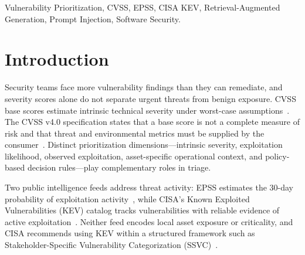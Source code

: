 \documentclass[conference]{IEEEtran}
\begin{document}
\begin{IEEEkeywords}
Vulnerability Prioritization, CVSS, EPSS, CISA KEV, Retrieval-Augmented Generation, Prompt Injection, Software Security.
\end{IEEEkeywords}

\section{Introduction}
Security teams face more vulnerability findings than they can remediate, and severity scores alone do not separate urgent threats from benign exposure. CVSS base scores estimate intrinsic technical severity under worst-case assumptions~\cite{first2019cvss}. The CVSS v4.0 specification states that a base score is not a complete measure of risk and that threat and environmental metrics must be supplied by the consumer~\cite{first2023cvss4}. Distinct prioritization dimensions---intrinsic severity, exploitation likelihood, observed exploitation, asset-specific operational context, and policy-based decision rules---play complementary roles in triage.

Two public intelligence feeds address threat activity: EPSS estimates the 30-day probability of exploitation activity~\cite{first2024epss, jacobs2021epss}, while CISA's Known Exploited Vulnerabilities (KEV) catalog tracks vulnerabilities with reliable evidence of active exploitation~\cite{cisa2024kev}. Neither feed encodes local asset exposure or criticality, and CISA recommends using KEV within a structured framework such as Stakeholder-Specific Vulnerability Categorization (SSVC)~\cite{spring2020ssvc, cisa2024ssvc}.
\end{document}
